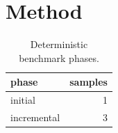 \section{Method}\label{sec:method}
\begin{table}[h]
  \centering
  \begin{tabular}{lr}
    \toprule
    phase & samples \\
    \midrule
    initial & 1 \\
    incremental & 3 \\
    \bottomrule
  \end{tabular}
  \caption{Deterministic benchmark phases.}
\end{table}
